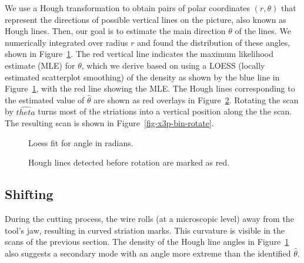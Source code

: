 \documentclass[
  authoryear,
  preprint,
  5p,
  twocolumn]{elsarticle}
\begin{document}
We use a Hough transformation \citep{dudaUseHoughTransformation1972} to
obtain pairs of polar coordinates \((r, \theta)\) that represent the
directions of possible vertical lines on the picture, also known as
Hough lines. Then, our goal is to estimate the main direction \(\theta\)
of the lines. We numerically integrated over radius \(r\) and found the
distribution of these angles, shown in
Figure~\ref{fig-x3p-hough-theta-loess}. The red vertical line indicates
the maximum likelihood estimate (MLE) for \(\theta\), which we derive
based on using a LOESS (locally estimated scatterplot smoothing) of the
density as shown by the blue line in
Figure~\ref{fig-x3p-hough-theta-loess}, with the red line showing the
MLE. The Hough lines corresponding to the estimated value of
\(\hat{\theta}\) are shown as red overlays in
Figure~\ref{fig-x3p-cimg-nfline}. Rotating the scan by \(\hat{theta}\)
turns most of the striations into a vertical position along the the
scan. The resulting scan is shown in Figure~\ref{fig-x3p-bin-rotate}.

\begin{figure}


\caption{\label{fig-x3p-hough-theta-loess}Loess fit for angle in
radians.}

\end{figure}%

\begin{figure}


\caption{\label{fig-x3p-cimg-nfline}Hough lines detected before rotation
are marked as red.}

\end{figure}%

\subsection{Shifting}\label{sec-Shifting}

During the cutting process, the wire rolls (at a microscopic level) away
from the tool's jaw, resulting in curved striation marks. This curvature
is visible in the scans of the previous section. The density of the
Hough line angles in Figure~\ref{fig-x3p-hough-theta-loess} also
suggests a secondary mode with an angle more extreme than the identified
\(\hat{\theta}\).
\end{document}
